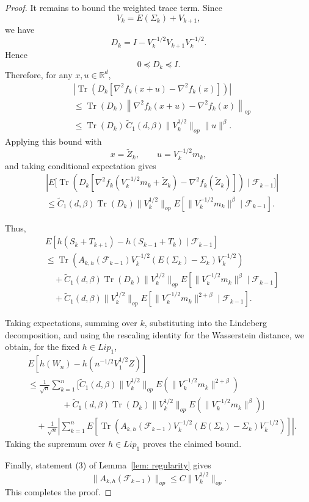 \documentclass[10pt,a4paper]{article}
\begin{document}
\begin{proof}
It remains to bound the weighted trace term. Since
\[
    V_k=E(\Sigma_k)+V_{k+1},
\]
we have
\[
    D_k=I-V_k^{-1/2}V_{k+1}V_k^{-1/2}.
\]
Hence
\[
    0\preceq D_k\preceq I.
\]
Therefore, for any \(x,u\in\mathbb R^d\),
\begin{align*}
&\left|
\operatorname{Tr}\left(
D_k
\left[
\nabla^2 f_k(x+u)-\nabla^2 f_k(x)
\right]
\right)
\right|
\\
&\le
\operatorname{Tr}(D_k)
\left\|
\nabla^2 f_k(x+u)-\nabla^2 f_k(x)
\right\|_{op}
\\
&\le
   \operatorname{Tr}(D_k)\,\tilde C_1(d,\beta)\|V_k^{1/2}\|_{op}\|u\|^\beta.
\end{align*}
Applying this bound with
\[
    x=\widetilde Z_k,
    \qquad
    u=V_k^{-1/2}m_k,
\]
and taking conditional expectation gives
\begin{align*}
&\left|
E\biggl[
\operatorname{Tr}\left(
D_k
\left[
\nabla^2 f_k\left(V_k^{-1/2}m_k+\widetilde Z_k\right)
-
\nabla^2 f_k(\widetilde Z_k)
\right]
\right)
\mid
\mathcal F_{k-1}
\biggr]
\right|
\\
&\le
\tilde C_1(d,\beta)\operatorname{Tr}(D_k)\|V_k^{1/2}\|_{op}
E\left[
\|V_k^{-1/2}m_k\|^\beta
\mid
\mathcal F_{k-1}
\right].
\end{align*}

Thus,
\begin{align*}
& E\left[
h(S_k+T_{k+1})-h(S_{k-1}+T_k)
\mid
\mathcal F_{k-1}
\right]
\\
&\le
\operatorname{Tr}\left(
A_{k,h}(\mathcal F_{k-1})
V_k^{-1/2}
\left(E(\Sigma_k)-\Sigma_k\right)
V_k^{-1/2}
\right)
\\
&\quad
+
\tilde C_1(d,\beta)\operatorname{Tr}(D_k)\|V_k^{1/2}\|_{op}
E\left[
\|V_k^{-1/2}m_k\|^\beta
\mid
\mathcal F_{k-1}
\right]
\\
&\quad
+
\tilde C_1(d,\beta)\|V_k^{1/2}\|_{op}
E\left[
\|V_k^{-1/2}m_k\|^{2+\beta}
\mid
\mathcal F_{k-1}
\right].
\end{align*}

Taking expectations, summing over \(k\), substituting into the Lindeberg
decomposition, and using the rescaling identity for the Wasserstein distance,
we obtain, for the fixed \(h\in Lip_1\),
\begin{align*}
& E\left[
h(W_n)-h(n^{-1/2}V_1^{1/2}Z)
\right]
\\
&\le
\frac{1}{\sqrt n}\sum_{k=1}^n
\Biggl[
\tilde C_1(d,\beta)\|V_k^{1/2}\|_{op}
E\left(\|V_k^{-1/2}m_k\|^{2+\beta}\right)
\\
&\qquad\qquad
+
\tilde C_1(d,\beta)\operatorname{Tr}(D_k)\|V_k^{1/2}\|_{op}
E\left(\|V_k^{-1/2}m_k\|^\beta\right)
\Biggr]
\\
&\quad
+
\frac{1}{\sqrt n}
\left|\sum_{k=1}^n
E\left[
\operatorname{Tr}\left(
A_{k,h}(\mathcal F_{k-1})
V_k^{-1/2}
\left(E(\Sigma_k)-\Sigma_k\right)
V_k^{-1/2}
\right)
\right]
\right|.
\end{align*}
Taking the supremum over \(h\in Lip_1\) proves the claimed bound.

Finally, statement (3) of Lemma~\ref{lem: regularity} gives
\[
    \|A_{k,h}(\mathcal F_{k-1})\|_{op}
    \le
    C\|V_k^{1/2}\|_{op}.
\]
This completes the proof.
\end{proof}
\end{document}
